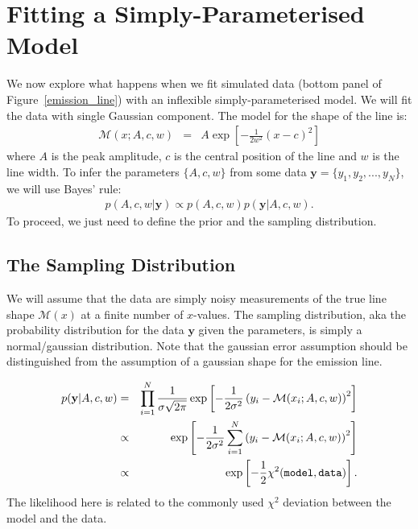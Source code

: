 \documentclass[letterpaper, 11pt]{article}
\newcommand{\yy}{\mathbf{y}}
\begin{document}
\section{Fitting a Simply-Parameterised Model}
We now explore what happens when we fit simulated data (bottom panel of
Figure~\ref{emission_line}) with an inflexible simply-parameterised model.
We will fit the data with single Gaussian component.
The model for the shape of the line is:
\begin{eqnarray}
\mathcal{M}(x; A, c, w) &=&
A\exp
\left[
-\frac{1}{2w^2}
\left(x - c\right)^2
\right]
\end{eqnarray}
where $A$ is the peak amplitude, $c$ is the central position of the line
and $w$ is the line width. To infer the parameters $\{A, c, w\}$ from some data
$\yy = \{y_1, y_2, ..., y_N\}$, we will use Bayes' rule:
\begin{eqnarray}
p(A, c, w | \yy) \propto p(A, c, w)p(\yy | A, c, w).
\end{eqnarray}
To proceed, we just need to define the prior and the sampling distribution.

\subsection{The Sampling Distribution}
We will assume that the data are simply noisy measurements of the true line shape
$\mathcal{M}(x)$ at a finite number of $x$-values.
The sampling distribution, aka the probability distribution for the data $\yy$ given
the parameters, is simply a normal/gaussian distribution. Note that the
gaussian error assumption should be distinguished from the assumption of a gaussian
shape for the emission line.

\begin{eqnarray}
p(\yy|A, c, w) &=& \prod_{i=1}^N
\frac{1}{\sigma\sqrt{2\pi}}
\exp
\left[
-\frac{1}{2\sigma^2}\left(y_i - \mathcal{M}(x_i; A, c, w)\right)^2
\right] \\
&\propto& \exp\left[-\frac{1}{2\sigma^2}\sum_{i=1}^N\left(y_i - \mathcal{M}(x_i; A, c, w)\right)^2\right] \\
&\propto& \exp\left[-\frac{1}{2}\chi^2({\tt model}, {\tt data})\right].
\end{eqnarray}
The likelihood here is related to the commonly used $\chi^2$ deviation between
the model and the data.
\end{document}
